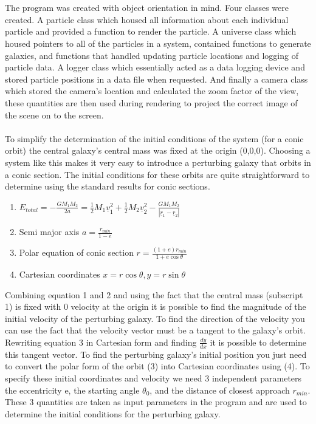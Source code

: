 \documentclass[10pt,a4paper]{article}
\begin{document}
\\
\\
The program was created with object orientation in mind. Four classes were created. A particle class which housed all information about each individual particle and provided a function to render the particle. A universe class which housed pointers to all of the particles in a system, contained functions to generate galaxies, and functions that handled updating particle locations and logging of particle data. A logger class which essentially acted as a data logging device and stored particle positions in a data file when requested. And finally a camera class which stored the camera's location and calculated the zoom factor of the view, these quantities are then used during rendering to project the correct image of the scene on to the screen.
\\
\\
To simplify the determination of the initial conditions of the system (for a conic orbit) the central galaxy's central mass was fixed at the origin (0,0,0). Choosing a system like this makes it very easy to introduce a perturbing galaxy that orbits in a conic section. The initial conditions for these orbits are quite straightforward to determine using the standard results for conic sections.

\begin{enumerate}
\item $E_{total} = -\frac{G M_1 M_2}{2 a} =\frac{1}{2} M_1 \underline{v}_1^2 + \frac{1}{2} M_2 \underline{v}_2^2 -\frac{G M_1 M_2}{|\underline{r}_1-\underline{r}_2|}$
\item Semi major axis $a = \frac{r_{min}}{1-e}$
\item Polar equation of conic section $r = \frac{(1+e)r_{min}}{1+e\cos{\theta}}$
\item Cartesian coordinates $x=r\cos{\theta},y=r\sin{\theta}$
\end{enumerate}

Combining equation 1 and 2 and using the fact that the central mass (subscript 1) is fixed with 0 velocity at the origin it is possible to find the magnitude of the initial velocity of the perturbing galaxy. To find the direction of the velocity you can use the fact that the velocity vector must be a tangent to the galaxy's orbit. Rewriting equation 3 in Cartesian form and finding $\frac{dy}{dx}$ it is possible to determine this tangent vector. To find the perturbing galaxy's initial position you just need to convert the polar form of the orbit (3) into Cartesian coordinates using (4). To specify these initial coordinates and velocity we need 3 independent parameters the eccentricity e, the starting angle $\theta_0$, and the distance of closest approach $r_{min}$. These 3 quantities are taken as input parameters in the program and are used to determine the initial conditions for the perturbing galaxy.
\end{document}
